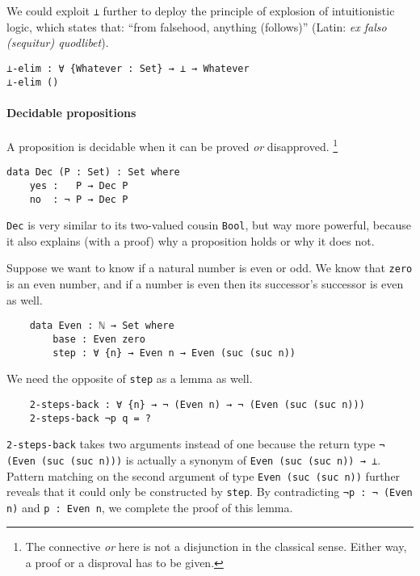 \documentclass[\main/thesis.tex]{subfiles}
\begin{document}
We could exploit {\lstinline|⊥|} further to deploy the principle of explosion
of intuitionistic logic, which states that: ``from falsehood, anything (follows)''
(Latin: \textit{ex falso (sequitur) quodlibet}).

\begin{lstlisting}
⊥-elim : ∀ {Whatever : Set} → ⊥ → Whatever
⊥-elim ()
\end{lstlisting}


\paragraph{Decidable propositions}

A proposition is decidable when it can be proved \textit{or} disapproved.
\footnote{The connective \textit{or} here is not a disjunction in the classical sense.
Either way, a proof or a disproval has to be given.}

\begin{lstlisting}
data Dec (P : Set) : Set where
    yes :   P → Dec P
    no  : ¬ P → Dec P
\end{lstlisting}

{\lstinline|Dec|} is very similar to its two-valued cousin {\lstinline|Bool|},
but way more powerful, because it also explains (with a proof) why a proposition
holds or why it does not.

Suppose we want to know if a natural number is even or odd. We know that {\lstinline|zero|}
is an even number, and if a number is even then its successor's successor is even as well.

\begin{lstlisting}
    data Even : ℕ → Set where
        base : Even zero
        step : ∀ {n} → Even n → Even (suc (suc n))
\end{lstlisting}

We need the opposite of {\lstinline|step|} as a lemma as well.

\begin{lstlisting}
    2-steps-back : ∀ {n} → ¬ (Even n) → ¬ (Even (suc (suc n)))
    2-steps-back ¬p q = ?
\end{lstlisting}

{\lstinline|2-steps-back|} takes two arguments instead of one because the return
type {\lstinline|¬ (Even (suc (suc n)))|} is actually a synonym of
{\lstinline|Even (suc (suc n)) → ⊥|}. Pattern matching on the second argument
of type {\lstinline|Even (suc (suc n))|} further reveals that it could only be
constructed by {\lstinline|step|}.  By contradicting {\lstinline|¬p : ¬ (Even n)|}
and {\lstinline|p : Even n|}, we complete the proof of this lemma.
\end{document}
